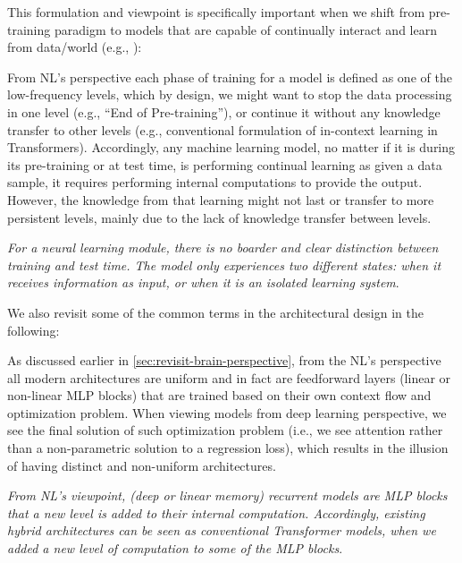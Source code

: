 \documentclass{article}
\newcommand{\citet}{\textcite}
\newcommand{\headred}[1]{\vspace{1.7mm}\noindent{{\textcolor{c5}{\bf #1.}}}}
\begin{document}
{This formulation and viewpoint is specifically important when we shift from pre-training paradigm to models that are capable of continually interact and learn from data/world (e.g., \citet{sutton2025oak}):

\headred{Continual Learning} 
From NL's perspective each phase of training for a model is defined as one of the low-frequency levels, which by design, we might want to stop the data processing in one level (e.g., ``End of Pre-training''), or continue it without any knowledge transfer to other levels (e.g., conventional formulation of in-context learning in Transformers). Accordingly, any machine learning model, no matter if it is during its pre-training or at test time, is performing continual learning as given a data sample, it requires performing internal computations to provide the output. However, the knowledge from that learning might not last or transfer to more persistent levels, mainly due to the lack of knowledge transfer between levels. 

\begin{myboxismall}
    \textit{For a neural learning module, there is no boarder and clear distinction between training and test time. The model only experiences two different states: when it receives information as input, or when it is an isolated learning system}.
\end{myboxismall}

We also revisit some of the common terms in the architectural design in the following:

\headred{Existing Architectural Backbones and Hybrid Models}
As discussed earlier in \autoref{sec:revisit-brain-perspective}, from the NL's perspective all modern architectures are uniform and in fact are feedforward layers (linear or non-linear MLP blocks) that are trained based on their own context flow and optimization problem. When viewing models from deep learning perspective, we see the final solution of such optimization problem (i.e., we see attention rather than a non-parametric solution to a regression loss), which results in the illusion of having distinct and non-uniform architectures.

\begin{myboxismall}
    \textit{From NL's viewpoint, (deep or linear memory) recurrent models are MLP blocks that a new level is added to their internal computation. Accordingly, existing hybrid architectures can be seen as conventional Transformer models, when we added a new level of computation to some of the MLP blocks}.
\end{myboxismall}

}
\end{document}
